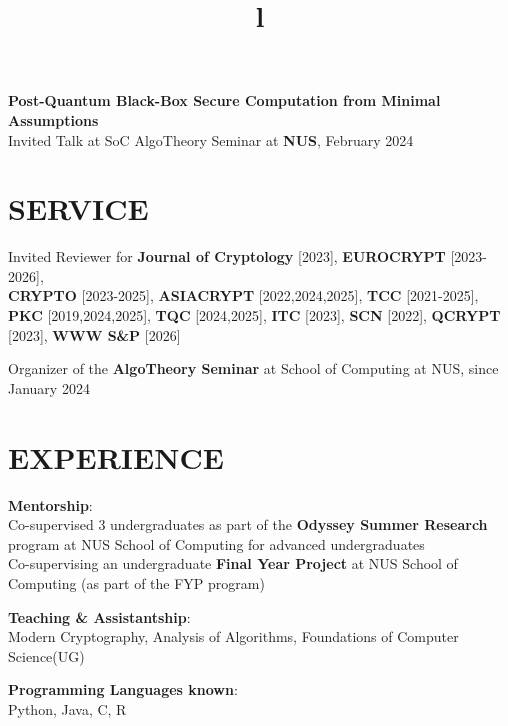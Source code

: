 \documentclass[margin]{res}
\begin{document}
\begin{resume}

\textbf{Post-Quantum Black-Box Secure Computation from Minimal Assumptions}\\ Invited Talk at SoC AlgoTheory Seminar at \textbf{NUS}, February 2024


\section{SERVICE}

Invited Reviewer for \textbf{Journal of Cryptology} [2023], \textbf{EUROCRYPT} [2023-2026], \\ \textbf{CRYPTO} [2023-2025], \textbf{ASIACRYPT} [2022,2024,2025], \textbf{TCC} [2021-2025], \\ \textbf{PKC} [2019,2024,2025], \textbf{TQC} [2024,2025], \textbf{ITC} [2023], \textbf{SCN} [2022], \textbf{QCRYPT} [2023], \textbf{WWW S\&P} [2026]

Organizer of the {\bf AlgoTheory Seminar} at School of Computing at NUS, since January 2024


\section{EXPERIENCE}

\textbf{Mentorship}: \\ Co-supervised 3 undergraduates as part of the {\bf Odyssey Summer Research} program at NUS School of Computing for advanced undergraduates 
\\ Co-supervising an undergraduate {\bf Final Year Project} at NUS School of Computing (as part of the FYP program)

\textbf{Teaching \& Assistantship}: \\ Modern Cryptography, Analysis of Algorithms, Foundations of Computer Science(UG)

\textbf{Programming Languages known}:\\  Python, Java, C, R \\

\begin{format}
\title{l}\\
\\
\body\\
\end{format}




\end{resume}
\end{document}
